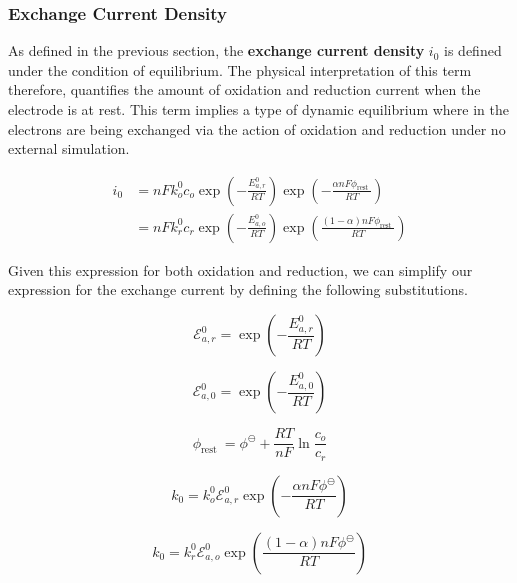 \documentclass[lettersize,journal]{IEEEtran}
\begin{document}
\subsubsection{Exchange Current Density}
As defined in the previous section, the \textbf{exchange current density}  $i_0$ is defined under the condition of equilibrium. The physical interpretation of this term therefore, quantifies the amount of oxidation and reduction current when the electrode is at rest. This term implies a type of dynamic equilibrium where in the electrons are being exchanged via the action of oxidation and reduction under no external simulation.

\begin{equation}
\begin{aligned}
i_{0} &=n F k_{o}^{0} c_{o} \exp \left(-\frac{E_{a, r}^{0}}{R T}\right) \exp \left(-\frac{\alpha n F \phi_{\text {rest }}}{R T}\right) \\
&=n F k_{r}^{0} c_{r} \exp \left(-\frac{E_{a, o}^{0}}{R T}\right) \exp \left(\frac{(1-\alpha) n F \phi_{\text {rest }}}{R T}\right)
\end{aligned}
\end{equation}


\noindent Given this expression for both oxidation and reduction, we can simplify our expression for the exchange current by defining the following substitutions.

\begin{equation}
  \mathscr{E}_{a, r}^{0}=\exp \left(-\frac{E_{a, r}^{0}}{R T}\right)
\end{equation}

\begin{equation}
   \mathscr{E}_{a, 0}^{0}=\exp \left(-\frac{E_{a, 0}^{0}}{R T}\right)
\end{equation}

\begin{equation}
\phi_{\text {rest }} =\phi^{\ominus}+\frac{R T}{n F} \ln \frac{c_{o}}{c_{r}}
\end{equation}



\begin{equation}
k_{0}=k_{o}^{0} \mathscr{E}_{a, r}^{0} \exp \left(-\frac{\alpha n F \phi^{\ominus}}{R T}\right)
\end{equation}

\begin{equation}
  k_{0} =k_{r}^{0} \mathscr{E}_{a, o}^{0} \exp \left(\frac{(1-\alpha) n F \phi^{\ominus}}{R T}\right)
\end{equation}
\end{document}
